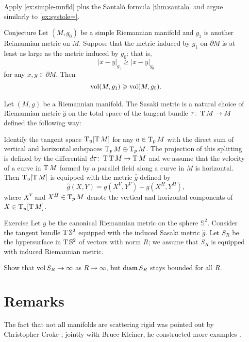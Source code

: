 Apply \ref{ex:simple-mnfld} plus the Santal\'{o} formula \ref{thm:santalo} and argue similarly to \ref{ex:systole=}.

\begin{thm}{Conjecture}
Let $(M,g_0)$ be a simple Riemannian manifold and $g_1$ is another Reimannian metric on $M$.
Suppose that the metric induced by $g_1$ on $\partial M$ is at least as large as the metric induced by $g_0$;
that is,
\[|x-y|_{g_1}\ge|x-y|_{g_0}\]
for any $x,y\in\partial M$.
Then 
\[\operatorname{\rm vol}\nolimits (M,g_1)\geqslant \operatorname{\rm vol}\nolimits (M,g_0).\]

\end{thm}


\bigskip

Let $(M,g)$ be a Riemannian manifold.
The Sasaki metric is a natural choice of Riemannian metric $\hat g$ on the total space of the tangent bundle $\tau\colon\operatorname{\rm T} M\to M$ defined the following way:

Identify the tangent space 
$\operatorname{\rm T}_u[\operatorname{\rm T} M]$ for any $u\z\in \T_p M$ with the direct sum of vertical and horizontal subspaces $\T_p M\z\oplus \T_p M$.
The projection of this splitting is defined by the differential $d\tau\colon\operatorname{\rm T}\operatorname{\rm T} M\to \operatorname{\rm T} M$
and we assume that the velocity of a curve in $\operatorname{\rm T} M$ formed by a parallel field along a curve in $M$ is horizontal.
Then $\operatorname{\rm T}_u[\operatorname{\rm T} M]$ is equipped with the metric $\hat g$ defined by
\[\hat g(X,Y)=g(X^V,Y^V)+g(X^H,Y^H),\]
where $X^V$ and $X^H\in\operatorname{\rm T}_pM$ denote the vertical and horizontal components of $X\in\operatorname{\rm T}_u[\operatorname{\rm T} M]$.



\begin{thm}{Exercise}
Let $g$ be the canonical Riemannian metric on the sphere $\mathbb{S}^2$.
Consider the tangent bundle $\operatorname{\rm T} \mathbb{S}^2$ 
equipped with the induced Sasaki metric $\hat g$.
Let $S_R$ be the hypersurface in $\operatorname{\rm T} \mathbb{S}^2$ of vectors with norm $R$;
we assume that $S_R$ is equipped with induced Riemannian metric.

Show that $\operatorname{\rm vol}\nolimits S_R\to \infty$ as $R\to\infty$,
but $\operatorname{\rm diam}\nolimits S_R$ stays bounded for all $R$.
\end{thm}



\section{Remarks}

The fact that not all manifolds are scattering rigid was pointed out by Christopher Croke \cite{croke-1991};
jointly with  Bruce Kleiner, he constructed more examples \cite{croke-kleiner-1994}.

